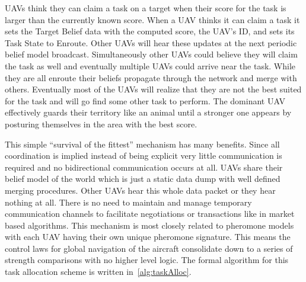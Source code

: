 UAVs think they can claim a task on a target when their score for the task is larger than the currently known score.  When a UAV thinks it can claim a task it sets the Target Belief data with the computed score, the UAV's ID, and sets its Task State to Enroute.  Other UAVs will hear these updates at the next periodic belief model broadcast.  Simultaneously other UAVs could believe they will claim the task as well and eventually multiple UAVs could arrive near the task.  While they are all enroute their beliefs propagate through the network and merge with others.  Eventually most of the UAVs will realize that they are not the best suited for the task and will go find some other task to perform.  The dominant UAV effectively guards their territory like an animal until a stronger one appears by posturing themselves in the area with the best score.

This simple ``survival of the fittest'' mechanism has many benefits.  Since all coordination is implied instead of being explicit very little communication is required and no bidirectional communication occurs at all.  UAVs share their belief model of the world which is just a static data dump with well defined merging procedures.  Other UAVs hear this whole data packet or they hear nothing at all.  There is no need to maintain and manage temporary communication channels to facilitate negotiations or transactions like in market based algorithms.  This mechanism is most closely related to pheromone models with each UAV having their own unique pheromone signature.  This means the control laws for global navigation of the aircraft consolidate down to a series of strength comparisons with no higher level logic.  The formal algorithm for this task allocation scheme is written in~\ref{alg:taskAlloc}.

